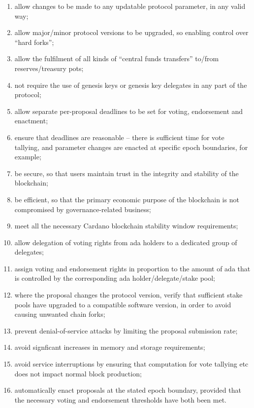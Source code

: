 \begin{enumerate}
\item
  allow changes to be made to any updatable protocol parameter, in any valid way;
\item
  allow major/minor protocol versions to be upgraded, so enabling control over ``hard forks'';
\item
  allow the fulfilment of all kinds of ``central funds transfers'' to/from reserves/treasury pots;
\item
  not require the use of genesis keys or genesis key delegates in any part of the protocol;
\item
  allow separate per-proposal deadlines to be set for voting, endorsement and enactment;
\item
  ensure that deadlines are reasonable -- there is sufficient time for vote tallying, and parameter changes
  are enacted at specific epoch boundaries, for example;
\item
  be secure, so that users maintain trust in the integrity and stability of the blockchain;
\item
  be efficient, so that the primary economic purpose of the blockchain is not compromised by governance-related business;
\item
  meet all the necessary Cardano blockchain stability window requirements;
\item
  allow delegation of voting rights from ada holders to a dedicated group of delegates;
\item
  assign voting and endorsement rights in proportion to the amount of ada that is controlled by the corresponding ada holder/delegate/stake pool;
\item
  where the proposal changes the protocol version, verify that sufficient stake pools have upgraded to a compatible software version, in order to avoid causing unwanted chain forks;
\item
  prevent denial-of-service attacks by limiting the proposal submission rate;
\item
  avoid signficant increases in memory and storage requirements;
\item
  avoid service interruptions by ensuring that computation for vote tallying etc does not impact normal block production;
\item
  automatically enact proposals at the stated epoch boundary, provided that the necessary voting and endorsement thresholds have both been met.
\end{enumerate}

